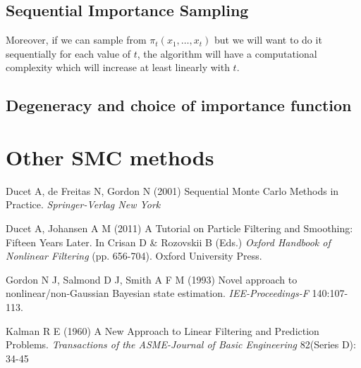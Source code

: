 \documentclass[11pt,a4paper]{article}
\begin{document}
\subsection{Sequential Importance Sampling}

Moreover, if we can sample from $\pi_t (x_1, \dots, x_t)$ but we will want to do it sequentially for each value of $t$, the algorithm will have a computational complexity which will increase at least linearly with $t$. 

\subsection{Degeneracy and choice of importance function}

\section{Other SMC methods}




\begin{thebibliography}{99}

 Ducet A, de Freitas N, Gordon N (2001) Sequential Monte Carlo Methods in Practice. \textit{Springer-Verlag New York}

 Ducet A, Johansen A M (2011) A Tutorial on Particle Filtering and Smoothing: Fifteen Years Later. In Crisan D & Rozovskii B (Eds.) \textit{Oxford Handbook of Nonlinear Filtering} (pp. 656-704). Oxford University Press.

 Gordon N J, Salmond D J, Smith A F M (1993) Novel approach to nonlinear/non-Gaussian Bayesian state estimation. \textit{IEE-Proceedings-F} 140:107-113.

 Kalman R E (1960) A New Approach to Linear Filtering and Prediction Problems. \textit{Transactions of the ASME-Journal of Basic Engineering} 82(Series D): 34-45



\end{thebibliography}
\end{document}
